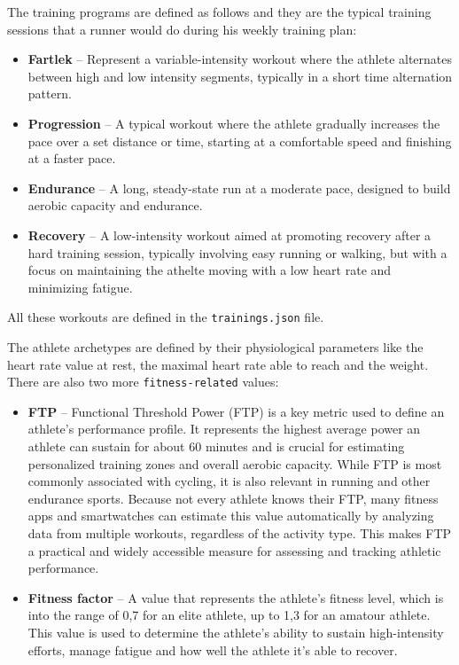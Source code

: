 The training programs are defined as follows and they are the typical training sessions that a runner would do during his weekly training plan:
\begin{itemize}
  \item \textbf{Fartlek} – Represent a variable-intensity workout where the athlete alternates between high and low intensity segments, typically in a short time alternation pattern.
  \item \textbf{Progression} – A typical workout where the athlete gradually increases the pace over a set distance or time, starting at a comfortable speed and finishing at a faster pace.
  \item \textbf{Endurance} – A long, steady-state run at a moderate pace, designed to build aerobic capacity and endurance.
  \item \textbf{Recovery} – A low-intensity workout aimed at promoting recovery after a hard training session, typically involving easy running or walking, but with a focus on maintaining the athelte moving with a low heart rate and minimizing fatigue.
\end{itemize}
All these workouts are defined in the \texttt{trainings.json} file.

The athlete archetypes are defined by their physiological parameters like the heart rate value at rest, the maximal heart rate able to reach and the weight. There are also two more \texttt{fitness-related} values: 
\begin{itemize}
\item \textbf{FTP} – Functional Threshold Power (FTP) is a key metric used to define an athlete's performance profile. It represents the highest average power an athlete can sustain for about 60 minutes and is crucial for estimating personalized training zones and overall aerobic capacity. While FTP is most commonly associated with cycling, it is also relevant in running and other endurance sports. Because not every athlete knows their FTP, many fitness apps and smartwatches can estimate this value automatically by analyzing data from multiple workouts, regardless of the activity type. This makes FTP a practical and widely accessible measure for assessing and tracking athletic performance.
\item \textbf{Fitness factor} – A value that represents the athlete's fitness level, which is into the range of 0,7 for an elite athlete, up to 1,3 for an amatour athlete. This value is used to determine the athlete's ability to sustain high-intensity efforts, manage fatigue and how well the athlete it's able to recover.
\end{itemize}

